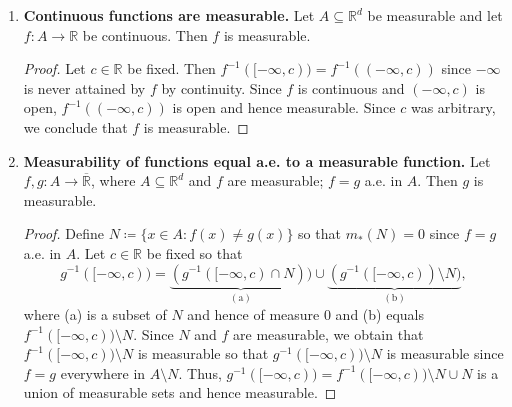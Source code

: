 \begin{enumerate}
\begin{proof}
	(a) iff (c). \( A \) measurable \( \iff  A^{c} \) measurable \( \iff  \) for each \( \varepsilon > 0 \) there exists an open set \( \mathcal{O} _\varepsilon  \) such that \( A^{c} \subseteq \mathcal{O} _\varepsilon  \) and \( m_*(\mathcal{O} _\varepsilon \setminus A^{c} ) = m_*(\mathcal{O} _\varepsilon  \cap A) = m_*(A \setminus \mathcal{O} _\varepsilon ^{c} ) < \varepsilon    \), and \( F \coloneqq \mathcal{O} _\varepsilon ^{c}  \) contains \( A \) since \( A^{c} \subseteq \mathcal{O} _\varepsilon ^{c}  \). (d) iff (e). (d) is equivalent to: there exists an \( F_\sigma  \) set \( F \coloneqq G^{c}  \) and a set \( N \subseteq F^{c} = G \) such that \( A^{c} = F^{c} \setminus N \), i.e. \( A = F \cup N \).
	\end{proof}
\item \textbf{Continuous functions are measurable.} Let \( A \subseteq \mathbb{R}^{d}  \) be measurable and let \( f : A \to \mathbb{R} \) be continuous. Then \( f \) is measurable.
	\begin{proof}\renewcommand{\qedsymbol}{} Let \( c \in \mathbb{R} \) be fixed. Then \( f^{-1} ([-\infty,c)) = f^{-1} ((-\infty,c))\) since \( -\infty \) is never attained by \( f \) by continuity. Since \( f \) is continuous and \( (-\infty,c) \) is open, \( f^{-1} ((-\infty,c)) \) is open and hence measurable. Since \( c \) was arbitrary, we conclude that \( f \) is measurable.
	\end{proof}
\item \textbf{Measurability of functions equal a.e. to a measurable function.} Let \( f, g : A \to \overline{\mathbb{R}} \), where \( A \subseteq \mathbb{R}^{d}  \) and \( f \) are measurable; \( f = g \) a.e. in \( A \). Then \( g \) is measurable.
	\begin{proof}\renewcommand{\qedsymbol}{}
		Define \( N \coloneqq \{ x \in A : f(x) \neq g(x) \}  \) so that \( m_*(N) = 0 \) since \(  f = g  \) a.e. in \( A \). Let \( c \in \mathbb{R} \) be fixed so that \[g^{-1} ([-\infty,c)) =\underbrace{(g^{-1}([-\infty,c) \cap N) )}_{(\mbox{a})} \cup \underbrace{(g^{-1}  ([-\infty,c)) \setminus N)}_{(\mbox{b})}, \] where (a) is a subset of \( N \) and hence of measure 0 and (b) equals \( f^{-1}([-\infty,c)) \setminus N  \). Since \( N \) and \( f \) are measurable, we obtain that \( f^{-1}([-\infty,c)) \setminus N  \) is measurable so that \( g^{-1}([-\infty,c)) \setminus N  \) is measurable since \( f = g \) everywhere in \( A \setminus N \). Thus, \( g^{-1}([-\infty,c)) = f^{-1}([-\infty,c))\setminus N \cup N   \) is a union of measurable sets and hence measurable.

\end{proof}
\end{enumerate}
